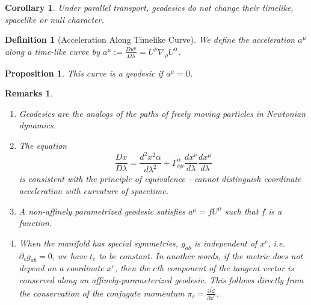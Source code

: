 \documentclass[a4paper]{article}
\newtheorem{remarks}{Remarks}[section]
\theoremstyle{new}
\newtheorem{defi}{Definition}[section]
\newtheorem{prop}{Proposition}[section]
\newtheorem{cor}{Corollary}[section]
\begin{document}
\begin{cor}
Under parallel transport, geodesics do not change their timelike, spacelike or null character.
\end{cor}
\begin{defi}[Acceleration Along Timelike Curve]
We define the acceleration $a^\mu$ along a time-like curve by $a^\mu:=\frac{Du^\mu}{D\lambda}=U^\rho\nabla_\rho U^\alpha$.
\end{defi}
\begin{prop}
This curve is a geodesic if $a^\mu=0$. 
\end{prop}
\begin{remarks}\leavevmode
\begin{enumerate}
    \item Geodesics are the analogs of the paths of freely moving particles in Newtonian dynamics.
    \item The equation
    $$\frac{D\dot{x}}{D\lambda}=\frac{d^2x^2\alpha}{d\lambda^2}+\Gamma_{\nu\mu}^\alpha\frac{dx^\nu}{d\lambda}\frac{dx^\mu}{d\lambda}$$
    is consistent with the principle of equivalence - cannot distinguish coordinate acceleration with curvature of spacetime.
    \item A non-affinely parametrized geodesic satisfies $a^\mu=fU^\mu$ such that $f$ is a function.
    \item When the manifold has special symmetries, $g_{ab}$ is independent of $x^c$, i.e. $\partial_cg_{ab}=0$, we have $t_c$ to be constant. In another words, if the metric does not depend on a coordinate $x^c$, then the $c$th component of the tangent vector is conserved along an affinely-parameterized geodesic. This follows directly from the conservation of the conjugate momentum $\pi_c=\frac{\partial\tilde{\mathcal{L}}}{\partial\dot{x}^c}$.
\end{enumerate}
\end{remarks}
\end{document}
